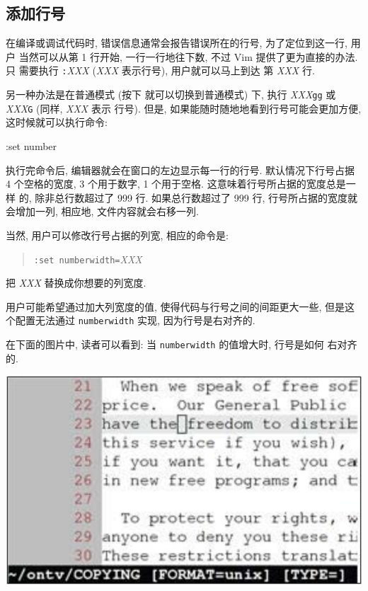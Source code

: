 \subsection{添加行号}
\label{subsec:adding_line_numbers}
在编译或调试代码时, 错误信息通常会报告错误所在的行号, 为了定位到这一行, 用户
当然可以从第 1 行开始, 一行一行地往下数, 不过 Vim 提供了更为直接的办法. 只
需要执行 \texttt{:}\textit{XXX} (\textit{XXX} 表示行号), 用户就可以马上到达
第 \textit{XXX} 行.

另一种办法是在普通模式 (按下  就可以切换到普通模式) 下, 执行 
\textit{XXX}\texttt{gg} 或 \textit{XXX}\texttt{G} (同样, \textit{XXX} 表示 
行号). 但是, 如果能随时随地地看到行号可能会更加方便, 这时候就可以执行命令:
\begin{vimcmd}
:set number
\end{vimcmd}

执行完命令后, 编辑器就会在窗口的左边显示每一行的行号. 默认情况下行号占据 4
个空格的宽度, 3 个用于数字, 1 个用于空格. 这意味着行号所占据的宽度总是一样
的, 除非总行数超过了 999 行. 如果总行数超过了 999 行, 行号所占据的宽度就
会增加一列, 相应地, 文件内容就会右移一列.

当然, 用户可以修改行号占据的列宽, 相应的命令是:
\begin{quotation}
\texttt{:set numberwidth=}\textit{XXX}
\end{quotation}
把 \textit{XXX} 替换成你想要的列宽度.

\begin{warning}
    用户可能希望通过加大列宽度的值, 使得代码与行号之间的间距更大一些, 
    但是这个配置无法通过 \texttt{numberwidth} 实现, 因为行号是右对齐的.
\end{warning}

在下面的图片中, 读者可以看到: 当 \texttt{numberwidth} 的值增大时, 行号是如何
右对齐的.

\begin{center}
\includegraphics[scale=0.4]{./images/page40.png}
\end{center}

